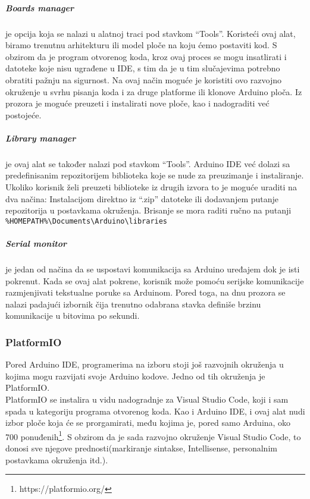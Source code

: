 \documentclass[../Document.tex]{subfiles}
\begin{document}
\subparagraph{Boards manager} je opcija koja se nalazi u alatnoj traci pod stavkom ``Tools''. Koristeći ovaj alat, biramo trenutnu arhitekturu ili model ploče na koju ćemo postaviti kod. S obzirom da je program otvorenog koda, kroz ovaj proces se mogu insatlirati i datoteke koje nisu ugrađene u IDE, s tim da je u tim slučajevima potrebno obratiti pažnju na sigurnost. Na ovaj način moguće je koristiti ovo razvojno okruženje u svrhu pisanja koda i za druge platforme ili klonove Arduino ploča. Iz prozora je moguće preuzeti i instalirati nove ploče, kao i nadograditi već postojeće.


\subparagraph{Library manager} je ovaj alat se također nalazi pod stavkom ``Tools''. Arduino IDE već dolazi sa predefinisanim repozitorijem biblioteka koje se nude za preuzimanje i instaliranje. Ukoliko korisnik želi preuzeti biblioteke iz drugih izvora to je moguće uraditi na dva načina: Instalacijom direktno iz ``.zip'' datoteke ili dodavanjem putanje repozitorija u postavkama okruženja. Brisanje se mora raditi ručno na putanji \verb|%HOMEPATH%\Documents\Arduino\libraries|


\subparagraph{Serial monitor} je jedan od načina da se uspostavi komunikacija sa Arduino uređajem dok je isti pokrenut. Kada se ovaj alat pokrene, korisnik može pomoću serijske komunikacije razmjenjivati tekstualne poruke sa Arduinom. Pored toga, na dnu prozora se nalazi padajući izbornik čija trenutno odabrana stavka definiše brzinu komunikacije u bitovima po sekundi.


\subsubsection{PlatformIO}

Pored Arduino IDE, programerima na izboru stoji još razvojnih okruženja u kojima mogu razvijati svoje Arduino kodove. Jedno od tih okruženja je PlatformIO.\\

PlatformIO se instalira u vidu nadogradnje za Visual Studio Code, koji i sam spada u kategoriju programa otvorenog koda. Kao i Arduino IDE, i ovaj alat nudi izbor ploče koja će se prorgamirati, među kojima je, pored samo Arduina, oko 700 ponuđenih\footnote{https://platformio.org/}. S obzirom da je sada razvojno okruženje Visual Studio Code, to donosi sve njegove prednosti(markiranje sintakse, Intellisense, personalnim postavkama okruženja itd.).\\
\end{document}
